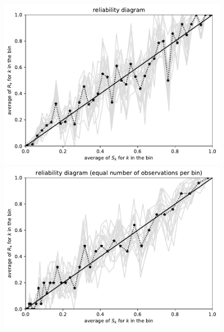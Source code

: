 \documentclass{article}
\begin{document}
\begin{figure}
\begin{centering}
\vspace{\vertsep}

\parbox{\imsize}{\includegraphics[width=\imsize]
                {./codes/unweighted/1000_40_1_3/equiprob.pdf}}
\quad\quad
\parbox{\imsize}{\includegraphics[width=\imsize]
                {./codes/unweighted/1000_40_1_3/equisamp.pdf}}

\vspace{\vertsep}


\end{centering}
\end{figure}
\end{document}
